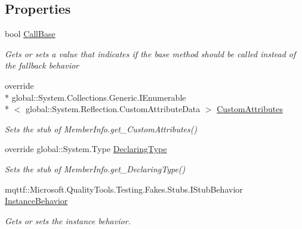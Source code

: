 \subsection*{Properties}
\begin{DoxyCompactItemize}
\item 
bool \hyperlink{class_system_1_1_reflection_1_1_fakes_1_1_stub_member_info_a94e5c7cd9cbbec0ac40f5491efcc309c}{Call\-Base}
\begin{DoxyCompactList}\small\item\em Gets or sets a value that indicates if the base method should be called instead of the fallback behavior\end{DoxyCompactList}\item 
override \\*
global\-::\-System.\-Collections.\-Generic.\-I\-Enumerable\\*
$<$ global\-::\-System.\-Reflection.\-Custom\-Attribute\-Data $>$ \hyperlink{class_system_1_1_reflection_1_1_fakes_1_1_stub_member_info_ad8e0706bff84d446a054bbff6abd1f1e}{Custom\-Attributes}
\begin{DoxyCompactList}\small\item\em Sets the stub of Member\-Info.\-get\-\_\-\-Custom\-Attributes()\end{DoxyCompactList}\item 
override global\-::\-System.\-Type \hyperlink{class_system_1_1_reflection_1_1_fakes_1_1_stub_member_info_a70ed5c23769a1560b516f0073f98a794}{Declaring\-Type}
\begin{DoxyCompactList}\small\item\em Sets the stub of Member\-Info.\-get\-\_\-\-Declaring\-Type()\end{DoxyCompactList}\item 
mqttf\-::\-Microsoft.\-Quality\-Tools.\-Testing.\-Fakes.\-Stubs.\-I\-Stub\-Behavior \hyperlink{class_system_1_1_reflection_1_1_fakes_1_1_stub_member_info_a5cc2e3d1d7afab5e8c143e0894788c1d}{Instance\-Behavior}
\begin{DoxyCompactList}\small\item\em Gets or sets the instance behavior.\end{DoxyCompactList}\item 

\end{DoxyCompactItemize}
